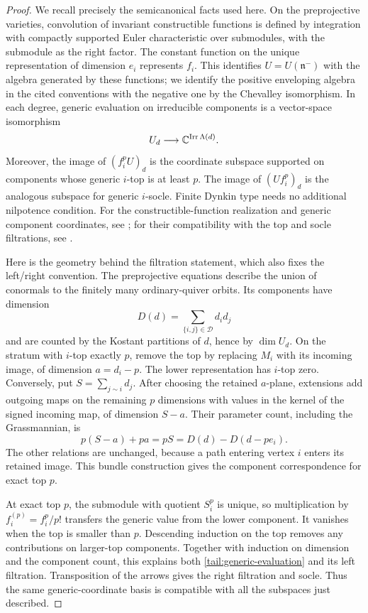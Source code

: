 \begin{proof}
We recall precisely the semicanonical facts used here.  On the
preprojective varieties, convolution of invariant constructible
functions is defined by integration with compactly supported Euler
characteristic over submodules, with the submodule as the right
factor.  The constant function on the unique representation of
dimension \(e_i\) represents \(f_i\).  This identifies
\(U=U(\mathfrak n^-)\) with the algebra generated by these functions;
we identify the positive enveloping algebra in the cited conventions
with the negative one by the Chevalley isomorphism.
In each degree, generic evaluation on irreducible components is a
vector-space isomorphism
\begin{equation}\label{tail:generic-evaluation}
 U_d \longrightarrow
 \mathbb C^{\operatorname{Irr}\Lambda(d)} .
\end{equation}
Moreover, the image of \((f_i^pU)_d\) is the coordinate subspace
supported on components whose generic \(i\)-top is at least \(p\).
The image of \((Uf_i^p)_d\) is the analogous subspace for generic
\(i\)-socle.  Finite Dynkin type needs no additional nilpotence
condition.  For the constructible-function realization and generic
component coordinates, see
\cite[Proposition~3.1 and Sections~5.2--5.6]{GLS05}; for their
compatibility with the top and socle filtrations, see
\cite[Lemmas~5.1, 5.4, 5.6, and 5.9]{FLX}.

Here is the geometry behind the filtration statement, which also
fixes the left/right convention.  The preprojective equations
describe the union of conormals to the finitely many ordinary-quiver
orbits.  Its components have dimension
\[
 D(d)=\sum_{\{i,j\}\in\mathcal D}d_i d_j
\]
and are counted by the Kostant partitions of \(d\), hence by
\(\dim U_d\).  On the stratum with \(i\)-top exactly \(p\), remove the
top by replacing \(M_i\) with its incoming image, of dimension
\(a=d_i-p\).  The lower representation has \(i\)-top zero.
Conversely, put \(S=\sum_{j\sim i}d_j\).  After choosing the retained
\(a\)-plane, extensions add outgoing maps on the remaining
\(p\) dimensions with values in the kernel of the signed incoming
map, of dimension \(S-a\).  Their parameter count, including the
Grassmannian, is
\[
 p(S-a)+pa=pS=D(d)-D(d-pe_i).
\]
The other relations are unchanged, because a path entering vertex
\(i\) enters its retained image.  This bundle construction gives the
component correspondence for exact top \(p\).

At exact top \(p\), the submodule with quotient \(S_i^p\) is unique,
so multiplication by \(f_i^{(p)}=f_i^p/p!\) transfers the generic
value from the lower component.  It vanishes when the top is smaller
than \(p\).  Descending induction on the top removes any contributions
on larger-top components.  Together with induction on dimension and
the component count, this explains both
\eqref{tail:generic-evaluation} and its left filtration.
Transposition of the arrows gives the right filtration and socle.
Thus the same generic-coordinate basis is compatible with all the
subspaces just described.


\end{proof}
